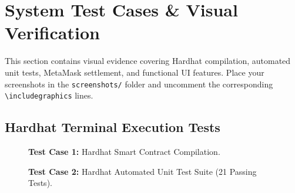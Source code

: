 \documentclass[12pt,a4paper]{article}
\begin{document}
\section{System Test Cases \& Visual Verification}

This section contains visual evidence covering Hardhat compilation, automated unit tests, MetaMask settlement, and functional UI features. Place your screenshots in the \texttt{screenshots/} folder and uncomment the corresponding \texttt{\textbackslash includegraphics} lines.

\subsection{Hardhat Terminal Execution Tests}

\begin{figure}[H]
\centering
\caption{\textbf{Test Case 1:} Hardhat Smart Contract Compilation.}
\label{fig:tc1_compile}
\end{figure}

\begin{figure}[H]
\centering
\caption{\textbf{Test Case 2:} Hardhat Automated Unit Test Suite (21 Passing Tests).}
\label{fig:tc2_tests}
\end{figure}
\end{document}
